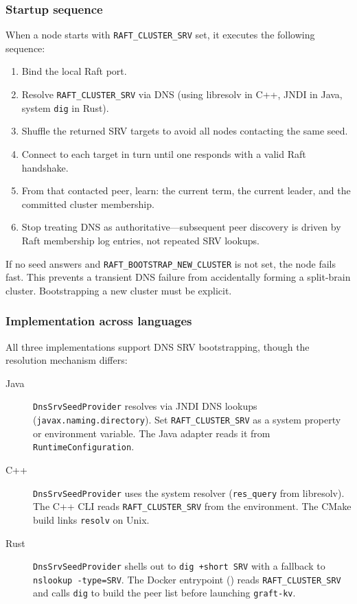 \subsubsection{Startup sequence}

When a node starts with \texttt{RAFT\_CLUSTER\_SRV} set, it executes the
following sequence:

\begin{enumerate}
\item Bind the local Raft port.
\item Resolve \texttt{RAFT\_CLUSTER\_SRV} via DNS (using libresolv in C++,
JNDI in Java, system \texttt{dig} in Rust).
\item Shuffle the returned SRV targets to avoid all nodes contacting the
same seed.
\item Connect to each target in turn until one responds with a valid Raft
handshake.
\item From that contacted peer, learn: the current term, the current leader,
and the committed cluster membership.
\item Stop treating DNS as authoritative---subsequent peer discovery is
driven by Raft membership log entries, not repeated SRV lookups.
\end{enumerate}

If no seed answers and \texttt{RAFT\_BOOTSTRAP\_NEW\_CLUSTER} is not set,
the node fails fast. This prevents a transient DNS failure from
accidentally forming a split-brain cluster. Bootstrapping a new cluster
must be explicit.

\subsubsection{Implementation across languages}

All three implementations support DNS SRV bootstrapping, though the
resolution mechanism differs:

\begin{description}
\item[Java] \texttt{DnsSrvSeedProvider} resolves via JNDI DNS lookups
(\texttt{javax.naming.directory}). Set \texttt{RAFT\_CLUSTER\_SRV} as a
system property or environment variable. The Java adapter reads it from
\texttt{RuntimeConfiguration}.
\item[C++] \texttt{DnsSrvSeedProvider} uses the system resolver
(\texttt{res\_query} from libresolv). The C++ CLI reads
\texttt{RAFT\_CLUSTER\_SRV} from the environment. The CMake build links
\texttt{resolv} on Unix.
\item[Rust] \texttt{DnsSrvSeedProvider} shells out to \texttt{dig +short SRV}
with a fallback to \texttt{nslookup -type=SRV}. The Docker entrypoint
() reads \texttt{RAFT\_CLUSTER\_SRV} and calls
\texttt{dig} to build the peer list before launching \texttt{graft-kv}.
\end{description}

